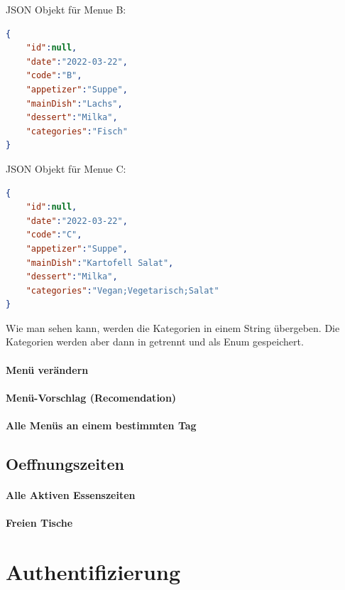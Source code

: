 JSON Objekt für Menue B:

\begin{lstlisting}[language=json,firstnumber=1]
{
    "id":null,
    "date":"2022-03-22",
    "code":"B",
    "appetizer":"Suppe",
    "mainDish":"Lachs",
    "dessert":"Milka",
    "categories":"Fisch"
}
\end{lstlisting}

JSON Objekt für Menue C:

\begin{lstlisting}[language=json,firstnumber=1]
{
    "id":null,
    "date":"2022-03-22",
    "code":"C",
    "appetizer":"Suppe",
    "mainDish":"Kartofell Salat",
    "dessert":"Milka",
    "categories":"Vegan;Vegetarisch;Salat"
}
\end{lstlisting}

Wie man sehen kann, werden die Kategorien in einem String übergeben. Die Kategorien werden aber dann in getrennt und als Enum gespeichert.

\paragraph{Menü verändern}

\paragraph{Menü-Vorschlag (Recomendation)}

\paragraph{Alle Menüs an einem bestimmten Tag}


\subsection{Oeffnungszeiten}

\paragraph{Alle Aktiven Essenszeiten}

\paragraph{Freien Tische}


\section{Authentifizierung}

